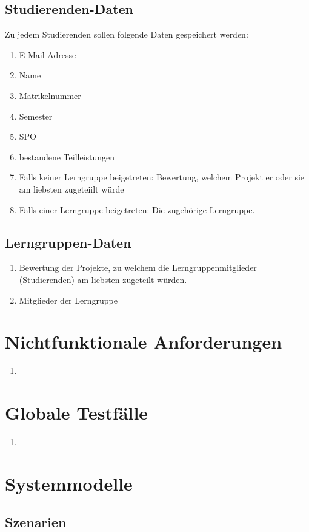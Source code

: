 \documentclass[parskip=full]{scrartcl}
\newcommand{\swtLabel}[1]{\textbf{\textbackslash #1\arabic*0\textbackslash}}
\begin{document}
\subsection{Studierenden-Daten} 
Zu jedem Studierenden sollen folgende Daten gespeichert werden:
\begin{enumerate}[label=\swtLabel{D}, resume] 
  \item E-Mail Adresse
  \item Name
  \item Matrikelnummer
  \item Semester
  \item SPO
  \item bestandene Teilleistungen
  \item Falls keiner Lerngruppe beigetreten: Bewertung, welchem Projekt er oder
  sie am liebsten zugeteiilt würde
  \item Falls einer Lerngruppe beigetreten: Die zugehörige Lerngruppe.
\end{enumerate}
\subsection{Lerngruppen-Daten} 
\begin{enumerate}[label=\swtLabel{D}, resume] 
  \item Bewertung der Projekte, zu welchem die Lerngruppenmitglieder
  (Studierenden) am liebsten zugeteilt würden.
  \item Mitglieder der Lerngruppe
\end{enumerate}

\section{Nichtfunktionale Anforderungen}
\begin{enumerate}
  \item 
\end{enumerate}
\section{Globale Testfälle}
\begin{enumerate}
  \item 
\end{enumerate}
\section{Systemmodelle}

\subsection{Szenarien}
\end{document}
